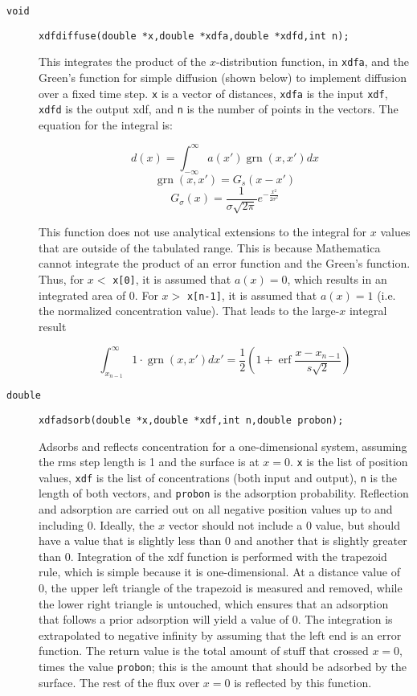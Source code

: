 \documentclass[11pt]{article}
\newcommand {\ttt} {\texttt}
\DeclareMathOperator{\erf}{erf}
\DeclareMathOperator{\grn}{grn}
\begin{document}
\begin{description}

\item[\ttt{void}] 
\ttt{xdfdiffuse(double *x,double *xdfa,double *xdfd,int n);}

This integrates the product of the $x$-distribution function, in \ttt{xdfa}, and the Green's function for simple diffusion (shown below) to implement diffusion over a fixed time step. \ttt{x} is a vector of distances, \ttt{xdfa} is the input \ttt{xdf}, \ttt{xdfd} is the output xdf, and \ttt{n} is the number of points in the vectors. The equation for the integral is:

$$d(x) = \int_{-\infty}^{\infty} a(x') \grn(x,x') dx$$
$$\grn(x,x') = G_s(x-x')$$
$$G_{\sigma}(x) = \frac{1}{\sigma \sqrt{2 \pi}}e^{-\frac{x^2}{2\sigma^2}}$$

This function does not use analytical extensions to the integral for $x$ values that are outside of the tabulated range. This is because Mathematica cannot integrate the product of an error function and the Green's function. Thus, for $x <$ \ttt{x[0]}, it is assumed that $a(x) = 0$, which results in an integrated area of 0. For $x >$ \ttt{x[n-1]}, it is assumed that $a(x) = 1$ (i.e. the normalized concentration value). That leads to the large-$x$ integral result

$$\int_{x_{n-1}}^{\infty} 1 \cdot \grn(x,x') dx' = \frac{1}{2} \left(1+\erf \frac{x-x_{n-1}}{s\sqrt{2}} \right)$$


\item[\ttt{double}] 
\ttt{xdfadsorb(double *x,double *xdf,int n,double probon);}

Adsorbs and reflects concentration for a one-dimensional system, assuming the rms step length is 1 and the surface is at $x = 0$. \ttt{x} is the list of position values, \ttt{xdf} is the list of concentrations (both input and output), \ttt{n} is the length of both vectors, and \ttt{probon} is the adsorption probability. Reflection and adsorption are carried out on all negative position values up to and including 0. Ideally, the $x$ vector should not include a 0 value, but should have a value that is slightly less than 0 and another that is slightly greater than 0. Integration of the xdf function is performed with the trapezoid rule, which is simple because it is one-dimensional. At a distance value of 0, the upper left triangle of the trapezoid is measured and removed, while the lower right triangle is untouched, which ensures that an adsorption that follows a prior adsorption will yield a value of 0. The integration is extrapolated to negative infinity by assuming that the left end is an error function. The return value is the total amount of stuff that crossed $x = 0$, times the value \ttt{probon}; this is the amount that should be adsorbed by the surface. The rest of the flux over $x = 0$ is reflected by this function.


\end{description}
\end{document}
